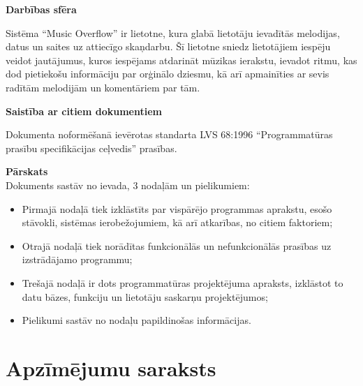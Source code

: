 \documentclass[12pt]{article}
\begin{document}
\textbf{Darbības sfēra}

Sistēma ``Music Overflow'' ir lietotne, kura glabā lietotāju ievadītās melodijas, datus un saites uz attiecīgo skaņdarbu. Šī lietotne sniedz lietotājiem iespēju veidot jautājumus, kuros iespējams atdarināt mūzikas ierakstu, ievadot ritmu, kas dod pietiekošu informāciju par orģinālo dziesmu, kā arī apmainīties ar sevis radītām melodijām un komentāriem par tām.


\textbf{Saistība ar citiem dokumentiem}

Dokumenta noformēšanā ievērotas standarta LVS 68:1996 ``Programmatūras prasību specifikācijas ceļvedis'' prasības.

\textbf{Pārskats}\\
Dokuments sastāv no ievada, 3 nodaļām un pielikumiem:
\begin{itemize}
\item Pirmajā nodaļā tiek izklāstīts par vispārējo programmas aprakstu, esošo stāvokli, sistēmas ierobežojumiem, kā arī atkarības, no citiem faktoriem;
\item Otrajā nodaļā tiek norādītas funkcionālās un nefunkcionālās prasības uz izstrādājamo programmu;
\item Trešajā nodaļā ir dots programmatūras projektējuma apraksts, izklāstot to datu bāzes, funkciju un lietotāju saskarņu projektējumos;
\item Pielikumi sastāv no nodaļu papildinošas informācijas.
\end{itemize}

\pagebreak

\section*{Apzīmējumu saraksts}
\end{document}
